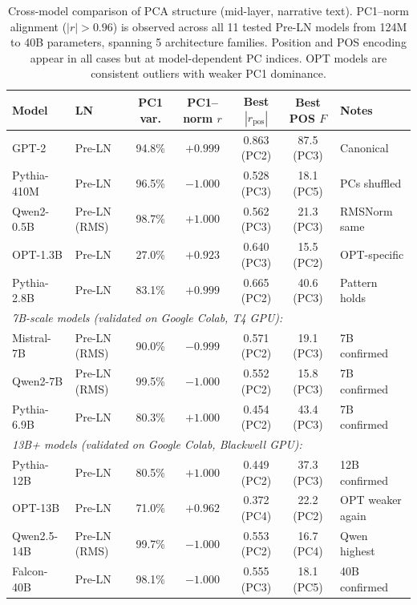 \documentclass[11pt,a4paper]{article}
\begin{document}
\begin{table}[H]
\centering
\caption{Cross-model comparison of PCA structure (mid-layer, narrative text). PC1--norm alignment ($|r| > 0.96$) is observed across all 11 tested Pre-LN models from 124M to 40B parameters, spanning 5 architecture families. Position and POS encoding appear in all cases but at model-dependent PC indices. OPT models are consistent outliers with weaker PC1 dominance.}
\label{tab:crossmodel}
\begin{tabular}{llccccl}
\toprule
Model & LN & PC1 var. & PC1--norm $r$ & Best $|r_\text{pos}|$ & Best POS $F$ & Notes \\
\midrule
GPT-2     & Pre-LN       & 94.8\% & $+0.999$ & 0.863 (PC2) & 87.5 (PC3) & Canonical \\
Pythia-410M & Pre-LN     & 96.5\% & $-1.000$ & 0.528 (PC3) & 18.1 (PC5) & PCs shuffled \\
Qwen2-0.5B & Pre-LN (RMS)& 98.7\% & $+1.000$ & 0.562 (PC3) & 21.3 (PC3) & RMSNorm same \\
OPT-1.3B  & Pre-LN       & 27.0\% & $+0.923$ & 0.640 (PC3) & 15.5 (PC2) & OPT-specific \\
Pythia-2.8B & Pre-LN     & 83.1\% & $+0.999$ & 0.665 (PC2) & 40.6 (PC3) & Pattern holds \\
\midrule
\multicolumn{7}{l}{\emph{7B-scale models (validated on Google Colab, T4 GPU):}} \\
Mistral-7B  & Pre-LN (RMS) & 90.0\% & $-0.999$ & 0.571 (PC2) & 19.1 (PC3) & 7B confirmed \\
Qwen2-7B    & Pre-LN (RMS) & 99.5\% & $-1.000$ & 0.552 (PC2) & 15.8 (PC3) & 7B confirmed \\
Pythia-6.9B & Pre-LN       & 80.3\% & $+1.000$ & 0.454 (PC2) & 43.4 (PC3) & 7B confirmed \\
\midrule
\multicolumn{7}{l}{\emph{13B+ models (validated on Google Colab, Blackwell GPU):}} \\
Pythia-12B  & Pre-LN       & 80.5\% & $+1.000$ & 0.449 (PC2) & 37.3 (PC3) & 12B confirmed \\
OPT-13B     & Pre-LN       & 71.0\% & $+0.962$ & 0.372 (PC4) & 22.2 (PC2) & OPT weaker again \\
Qwen2.5-14B & Pre-LN (RMS) & 99.7\% & $-1.000$ & 0.553 (PC2) & 16.7 (PC4) & Qwen highest \\
Falcon-40B  & Pre-LN       & 98.1\% & $-1.000$ & 0.555 (PC3) & 18.1 (PC5) & 40B confirmed \\
\bottomrule
\end{tabular}
\end{table}
\end{document}
